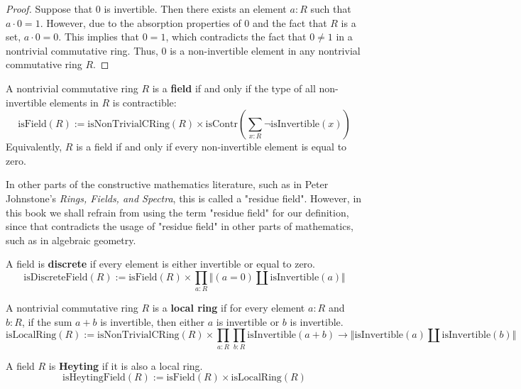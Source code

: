 \begin{proof}
Suppose that $0$ is invertible. Then there exists an element $a:R$ such that $a \cdot 0 = 1$. However, due to the absorption properties of $0$ and the fact that $R$ is a set, $a \cdot 0 = 0$. This implies that $0 = 1$, which contradicts the fact that $0 \neq 1$ in a nontrivial commutative ring. Thus, $0$ is a non-invertible element in any nontrivial commutative ring $R$. 
\end{proof}

\begin{definition}
A nontrivial commutative ring $R$ is a \textbf{field} if and only if the type of all non-invertible elements in $R$ is contractible:
$$\mathrm{isField}(R) := \mathrm{isNonTrivialCRing}(R) \times \mathrm{isContr}\left(\sum_{x:R} \neg \mathrm{isInvertible}(x)\right)$$ 
Equivalently, $R$ is a field if and only if every non-invertible element is equal to zero. 
\end{definition}

\begin{remark}
In other parts of the constructive mathematics literature, such as in Peter Johnstone's \textit{Rings, Fields, and Spectra}, this is called a "residue field". However, in this book we shall refrain from using the term "residue field" for our definition, since that contradicts the usage of "residue field" in other parts of mathematics, such as in algebraic geometry. 
\end{remark}

\begin{definition}
A field is \textbf{discrete} if every element is either invertible or equal to zero. 
$$\mathrm{isDiscreteField}(R) := \mathrm{isField}(R) \times \prod_{a:R} \Vert(a = 0) \amalg \mathrm{isInvertible}(a)\Vert$$ 
\end{definition}

\begin{definition}
A nontrivial commutative ring $R$ is a \textbf{local ring} if for every element $a:R$ and $b:R$, if the sum $a + b$ is invertible, then either $a$ is invertible or $b$ is invertible. 
$$\mathrm{isLocalRing}(R) := \mathrm{isNonTrivialCRing}(R) \times \prod_{a:R} \prod_{b:R} \mathrm{isInvertible}(a + b) \to \Vert\mathrm{isInvertible}(a) \amalg \mathrm{isInvertible}(b)\Vert$$ 
\end{definition}

\begin{definition}
A field $R$ is \textbf{Heyting} if it is also a local ring. 
$$\mathrm{isHeytingField}(R) := \mathrm{isField}(R) \times \mathrm{isLocalRing}(R)$$ 
\end{definition}

